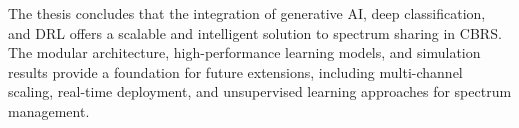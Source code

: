 The thesis concludes that the integration of generative AI, deep classification, and DRL offers a scalable and intelligent solution to spectrum sharing in CBRS. 
The modular architecture, high-performance learning models, and simulation results provide a foundation for future extensions, including multi-channel scaling, 
real-time deployment, and unsupervised learning approaches for spectrum management.




